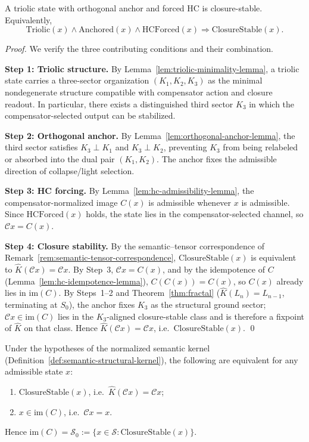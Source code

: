 \begin{lemma}
\label{lem:closure-forcing-lemma}
A triolic state with orthogonal anchor and forced HC is closure-stable.
Equivalently,
\[
\mathrm{Triolic}(x)\wedge \mathrm{Anchored}(x)\wedge \mathrm{HCForced}(x)
\Longrightarrow \mathrm{ClosureStable}(x).
\]
\end{lemma}

\begin{proof}
We verify the three contributing conditions and their combination.

\smallskip
\noindent\textbf{Step 1: Triolic structure.}
By Lemma~\ref{lem:triolic-minimality-lemma}, a triolic state carries a
three-sector organization $(K_1,K_2,K_3)$ as the minimal nondegenerate
structure compatible with compensator action and closure readout.
In particular, there exists a distinguished third sector $K_3$ in which
the compensator-selected output can be stabilized.

\smallskip
\noindent\textbf{Step 2: Orthogonal anchor.}
By Lemma~\ref{lem:orthogonal-anchor-lemma}, the third sector satisfies
$K_3\perp K_1$ and $K_3\perp K_2$, preventing $K_3$ from being
relabeled or absorbed into the dual pair $(K_1,K_2)$.
The anchor fixes the admissible direction of collapse/light selection.

\smallskip
\noindent\textbf{Step 3: HC forcing.}
By Lemma~\ref{lem:hc-admissibility-lemma}, the compensator-normalized
image $C(x)$ is admissible whenever $x$ is admissible. Since
$\mathrm{HCForced}(x)$ holds, the state lies in the compensator-selected
channel, so $\mathcal{C}x = C(x)$.

\smallskip
\noindent\textbf{Step 4: Closure stability.}
By the semantic--tensor correspondence of
Remark~\ref{rem:semantic-tensor-correspondence},
$\mathrm{ClosureStable}(x)$ is equivalent to
$\hat{K}(\mathcal{C}x) = \mathcal{C}x$.
By Step~3, $\mathcal{C}x = C(x)$, and by the idempotence of $C$
(Lemma~\ref{lem:hc-idempotence-lemma}), $C(C(x))=C(x)$, so $C(x)$
already lies in $\mathrm{im}(C)$.
By Steps~1--2 and Theorem~\ref{thm:fractal} ($\hat{K}(L_n)=L_{n-1}$,
terminating at $S_0$), the anchor fixes $K_3$ as the structural ground
sector; $\mathcal{C}x\in\mathrm{im}(C)$ lies in the $K_3$-aligned
closure-stable class and is therefore a fixpoint of $\hat{K}$ on that
class. Hence $\hat{K}(\mathcal{C}x)=\mathcal{C}x$, i.e.\ $\mathrm{ClosureStable}(x)$. \qed
\end{proof}

\begin{lemma}
\label{lem:closure-stable-iff-im-C}
Under the hypotheses of the normalized semantic kernel
(Definition~\ref{def:semantic-structural-kernel}), the following are equivalent
for any admissible state $x$:
\begin{enumerate}[label=(\roman*)]
  \item $\mathrm{ClosureStable}(x)$, i.e.\ $\hat{K}(\mathcal{C}x)=\mathcal{C}x$;
  \item $x \in \mathrm{im}(C)$, i.e.\ $\mathcal{C}x = x$.
\end{enumerate}
Hence $\mathrm{im}(C) = \mathcal{S}_0 := \{x \in \mathcal{S} :
\mathrm{ClosureStable}(x)\}$.
\end{lemma}

